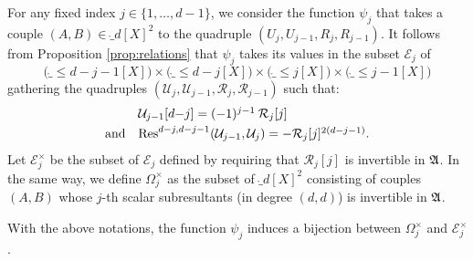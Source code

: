 \documentclass{sig-alternate}
\begin{document}
For any fixed index $j \in \{1, \ldots, d-1\}$, we consider the 
function $\psi_j$ that takes a couple $(A,B) \in \ring_d[X]^2$ to the
quadruple $(U_j, U_{j-1}, R_j, R_{j-1})$. It follows from Proposition
\ref{prop:relations} that $\psi_j$ takes its values in the subset 
$\mathcal E_j$ of
$$\big(\ring_{\leq d-j-1}[X]\big) \times \big(\ring_{\leq d-j}[X]\big) \times 
\big(\ring_{\leq j}[X]\big) \times \big(\ring_{\leq j-1}[X]\big)$$
gathering the quadruples $(\mathcal U_j, \mathcal U_{j-1}, \mathcal
R_j, \mathcal R_{j-1})$ such that:
$$\begin{array}{ll}
&\mathcal U_{j-1}[d{-}j] = (-1)^{j-1} \: \mathcal R_j[j] \smallskip \\
\text{and} &
\Res^{d-j,d-j-1}(\mathcal U_{j-1}, \mathcal U_j) = -\mathcal R_j[j]^{2(d-j-1)}.
\end{array}$$
Let $\mathcal E_j^\times$ be the subset of $\mathcal E_j$ defined by 
requiring that $\mathcal R_j[j]$ is invertible in $\mathfrak A$. In the same 
way, we define $\Omega_j^\times$ as the subset of $\ring_d[X]^2$ 
consisting of couples $(A,B)$ whose $j$-th scalar subresultants (in 
degree $(d,d)$) is invertible in $\mathfrak A$.

\begin{prop}
\label{prop:bijection}
With the above notations, the function $\psi_j$ induces a bijection between
$\Omega_j^\times$ and $\mathcal E_j^\times$.
\end{prop}
\end{document}
